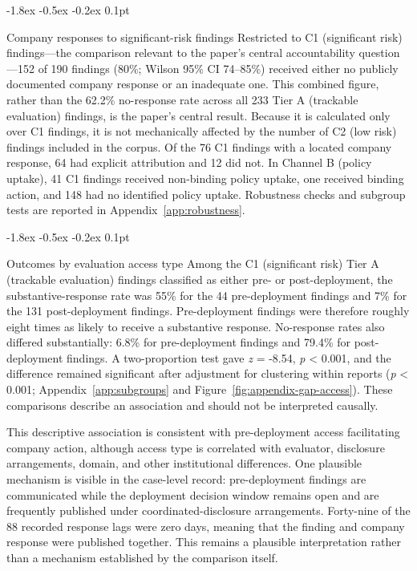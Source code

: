 \documentclass{article}
\makeatletter
\renewcommand{\subsection}{%
  \@startsection{subsection}{2}{\z@}%
                {-1.8ex \@plus -0.5ex \@minus -0.2ex}%
                {0.1pt}%
                {\normalsize\bf\raggedright}%
}
\makeatother
\begin{document}
\subsection{Company responses to significant-risk findings}\label{sec:headline}
Restricted to C1 (significant risk) findings---the comparison relevant to the paper's central accountability question---152 of 190 findings (80\%; Wilson 95\% CI 74--85\%) received either no publicly documented company response or an inadequate one. This combined figure, rather than the 62.2\% no-response rate across all 233 Tier A (trackable evaluation) findings, is the paper's central result. Because it is calculated only over C1 findings, it is not mechanically affected by the number of C2 (low risk) findings included in the corpus. Of the 76 C1 findings with a located company response, 64 had explicit attribution and 12 did not. In Channel B (policy uptake), 41 C1 findings received non-binding policy uptake, one received binding action, and 148 had no identified policy uptake. Robustness checks and subgroup tests are reported in Appendix~\ref{app:robustness}.

\subsection{Outcomes by evaluation access type}\label{sec:access}
Among the C1 (significant risk) Tier A (trackable evaluation) findings classified as either pre- or post-deployment, the substantive-response rate was 55\% for the 44 pre-deployment findings and 7\% for the 131 post-deployment findings. Pre-deployment findings were therefore roughly eight times as likely to receive a substantive response. No-response rates also differed substantially: 6.8\% for pre-deployment findings and 79.4\% for post-deployment findings. A two-proportion test gave \emph{z} = -8.54, \emph{p} \textless{} 0.001, and the difference remained significant after adjustment for clustering within reports (\emph{p} \textless{} 0.001; Appendix~\ref{app:subgroups} and Figure~\ref{fig:appendix-gap-access}). These comparisons describe an association and should not be interpreted causally.

This descriptive association is consistent with pre-deployment access facilitating company action, although access type is correlated with evaluator, disclosure arrangements, domain, and other institutional differences. One plausible mechanism is visible in the case-level record: pre-deployment findings are communicated while the deployment decision window remains open and are frequently published under coordinated-disclosure arrangements. Forty-nine of the 88 recorded response lags were zero days, meaning that the finding and company response were published together. This remains a plausible interpretation rather than a mechanism established by the comparison itself.
\end{document}
